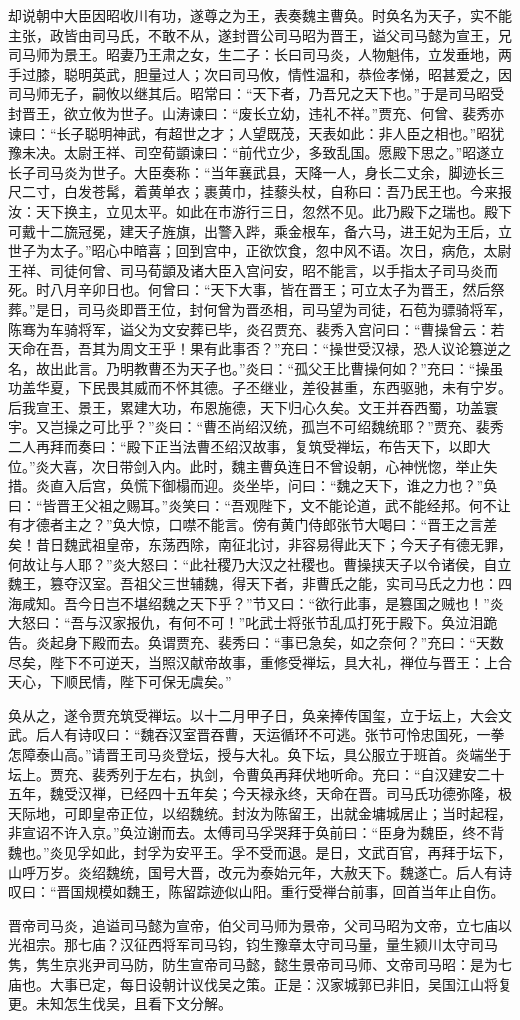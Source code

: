 却说朝中大臣因昭收川有功，遂尊之为王，表奏魏主曹奂。时奂名为天子，实不能主张，政皆由司马氏，不敢不从，遂封晋公司马昭为晋王，谥父司马懿为宣王，兄司马师为景王。昭妻乃王肃之女，生二子：长曰司马炎，人物魁伟，立发垂地，两手过膝，聪明英武，胆量过人；次曰司马攸，情性温和，恭俭孝悌，昭甚爱之，因司马师无子，嗣攸以继其后。昭常曰：“天下者，乃吾兄之天下也。”于是司马昭受封晋王，欲立攸为世子。山涛谏曰：“废长立幼，违礼不祥。”贾充、何曾、裴秀亦谏曰：“长子聪明神武，有超世之才；人望既茂，天表如此：非人臣之相也。”昭犹豫未决。太尉王祥、司空荀顗谏曰：“前代立少，多致乱国。愿殿下思之。”昭遂立长子司马炎为世子。大臣奏称：“当年襄武县，天降一人，身长二丈余，脚迹长三尺二寸，白发苍髯，着黄单衣；裹黄巾，挂藜头杖，自称曰：吾乃民王也。今来报汝：天下换主，立见太平。如此在市游行三日，忽然不见。此乃殿下之瑞也。殿下可戴十二旒冠冕，建天子旌旗，出警入跸，乘金根车，备六马，进王妃为王后，立世子为太子。”昭心中暗喜；回到宫中，正欲饮食，忽中风不语。次日，病危，太尉王祥、司徒何曾、司马荀顗及诸大臣入宫问安，昭不能言，以手指太子司马炎而死。时八月辛卯日也。何曾曰：“天下大事，皆在晋王；可立太子为晋王，然后祭葬。”是日，司马炎即晋王位，封何曾为晋丞相，司马望为司徒，石苞为骠骑将军，陈骞为车骑将军，谥父为文安葬已毕，炎召贾充、裴秀入宫问曰：“曹操曾云：若天命在吾，吾其为周文王乎！果有此事否？”充曰：“操世受汉禄，恐人议论篡逆之名，故出此言。乃明教曹丕为天子也。”炎曰：“孤父王比曹操何如？”充曰：“操虽功盖华夏，下民畏其威而不怀其德。子丕继业，差役甚重，东西驱驰，未有宁岁。后我宣王、景王，累建大功，布恩施德，天下归心久矣。文王并吞西蜀，功盖寰宇。又岂操之可比乎？”炎曰：“曹丕尚绍汉统，孤岂不可绍魏统耶？”贾充、裴秀二人再拜而奏曰：“殿下正当法曹丕绍汉故事，复筑受禅坛，布告天下，以即大位。”炎大喜，次日带剑入内。此时，魏主曹奂连日不曾设朝，心神恍惚，举止失措。炎直入后宫，奂慌下御榻而迎。炎坐毕，问曰：“魏之天下，谁之力也？”奂曰：“皆晋王父祖之赐耳。”炎笑曰：“吾观陛下，文不能论道，武不能经邦。何不让有才德者主之？”奂大惊，口噤不能言。傍有黄门侍郎张节大喝曰：“晋王之言差矣！昔日魏武祖皇帝，东荡西除，南征北讨，非容易得此天下；今天子有德无罪，何故让与人耶？”炎大怒曰：“此社稷乃大汉之社稷也。曹操挟天子以令诸侯，自立魏王，篡夺汉室。吾祖父三世辅魏，得天下者，非曹氏之能，实司马氏之力也：四海咸知。吾今日岂不堪绍魏之天下乎？”节又曰：“欲行此事，是篡国之贼也！”炎大怒曰：“吾与汉家报仇，有何不可！”叱武士将张节乱瓜打死于殿下。奂泣泪跪告。炎起身下殿而去。奂谓贾充、裴秀曰：“事已急矣，如之奈何？”充曰：“天数尽矣，陛下不可逆天，当照汉献帝故事，重修受禅坛，具大礼，禅位与晋王：上合天心，下顺民情，陛下可保无虞矣。”

奂从之，遂令贾充筑受禅坛。以十二月甲子日，奂亲捧传国玺，立于坛上，大会文武。后人有诗叹曰：“魏吞汉室晋吞曹，天运循环不可逃。张节可怜忠国死，一拳怎障泰山高。”请晋王司马炎登坛，授与大礼。奂下坛，具公服立于班首。炎端坐于坛上。贾充、裴秀列于左右，执剑，令曹奂再拜伏地听命。充曰：“自汉建安二十五年，魏受汉禅，已经四十五年矣；今天禄永终，天命在晋。司马氏功德弥隆，极天际地，可即皇帝正位，以绍魏统。封汝为陈留王，出就金墉城居止；当时起程，非宣诏不许入京。”奂泣谢而去。太傅司马孚哭拜于奂前曰：“臣身为魏臣，终不背魏也。”炎见孚如此，封孚为安平王。孚不受而退。是日，文武百官，再拜于坛下，山呼万岁。炎绍魏统，国号大晋，改元为泰始元年，大赦天下。魏遂亡。后人有诗叹曰：“晋国规模如魏王，陈留踪迹似山阳。重行受禅台前事，回首当年止自伤。

晋帝司马炎，追谥司马懿为宣帝，伯父司马师为景帝，父司马昭为文帝，立七庙以光祖宗。那七庙？汉征西将军司马钧，钧生豫章太守司马量，量生颍川太守司马隽，隽生京兆尹司马防，防生宣帝司马懿，懿生景帝司马师、文帝司马昭：是为七庙也。大事已定，每日设朝计议伐吴之策。正是：汉家城郭已非旧，吴国江山将复更。未知怎生伐吴，且看下文分解。